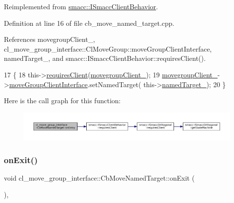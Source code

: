Reimplemented from \hyperlink{classsmacc_1_1ISmaccClientBehavior_a9877684b1954429719826e2d0924d980}{smacc\+::\+I\+Smacc\+Client\+Behavior}.



Definition at line 16 of file cb\+\_\+move\+\_\+named\+\_\+target.\+cpp.



References movegroup\+Client\+\_\+, cl\+\_\+move\+\_\+group\+\_\+interface\+::\+Cl\+Move\+Group\+::move\+Group\+Client\+Interface, named\+Target\+\_\+, and smacc\+::\+I\+Smacc\+Client\+Behavior\+::requires\+Client().


\begin{DoxyCode}
17 \{
18     this->\hyperlink{classsmacc_1_1ISmaccClientBehavior_a32b16e99e3b4cb289414203dc861a440}{requiresClient}(\hyperlink{classcl__move__group__interface_1_1CbMoveNamedTarget_ab19a253b419bdbf3ec4b4b45a4198a65}{movegroupClient\_});
19     \hyperlink{classcl__move__group__interface_1_1CbMoveNamedTarget_ab19a253b419bdbf3ec4b4b45a4198a65}{movegroupClient\_}->\hyperlink{classcl__move__group__interface_1_1ClMoveGroup_a92922ea689e4e1b7b91512c56629c95b}{moveGroupClientInterface}.setNamedTarget(
      this->\hyperlink{classcl__move__group__interface_1_1CbMoveNamedTarget_a597a5afdcba0359aaa8d3f923fdfe133}{namedTarget\_});
20 \}
\end{DoxyCode}
Here is the call graph for this function\+:
\nopagebreak
\begin{figure}[H]
\begin{center}
\leavevmode
\includegraphics[width=350pt]{classcl__move__group__interface_1_1CbMoveNamedTarget_ab212edda280e896977d7ac567e4c1b29_cgraph}
\end{center}
\end{figure}
\mbox{\label{classcl__move__group__interface_1_1CbMoveNamedTarget_ae7e89742c903577b71790370714047d8}} 
\subsubsection{\texorpdfstring{on\+Exit()}{onExit()}}
{\footnotesize\ttfamily void cl\+\_\+move\+\_\+group\+\_\+interface\+::\+Cb\+Move\+Named\+Target\+::on\+Exit (\begin{DoxyParamCaption}{ }\end{DoxyParamCaption})\hspace{0.3cm}{\ttfamily [override]}, {\ttfamily [virtual]}}



